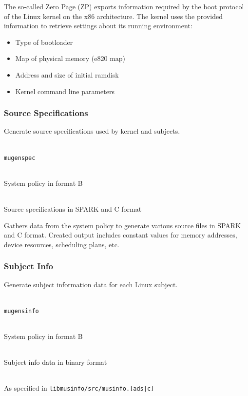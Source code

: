 \documentclass[a4paper,twoside,titlepage]{article}
\begin{document}
The so-called Zero Page (ZP) exports information required by the boot protocol
of the Linux kernel on the x86 architecture. The kernel uses the provided
information to retrieve settings about its running environment:
\begin{itemize}
	\item Type of bootloader
	\item Map of physical memory (e820 map)
	\item Address and size of initial ramdisk
	\item Kernel command line parameters
\end{itemize}

\subsubsection{Source Specifications}
\label{sec:tools-gen-spec}
Generate source specifications used by kernel and subjects.

\begin{description} \itemsep1pt \parskip0pt
	\item[Name] \hfill \\
		\texttt{mugenspec}
	\item[Input] \hfill \\
		System policy in format B
	\item[Output] \hfill \\
		Source specifications in SPARK and C format
\end{description}

Gathers data from the system policy to generate various source files in SPARK
and C format. Created output includes constant values for memory addresses,
device resources, scheduling plans, etc.

\subsubsection{Subject Info}
Generate subject information data for each Linux subject.

\begin{description} \itemsep1pt \parskip0pt
	\item[Name] \hfill \\
		\texttt{mugensinfo}
	\item[Input] \hfill \\
		System policy in format B
	\item[Output] \hfill \\
		Subject info data in binary format
	\item[Output format] \hfill \\
		As specified in \texttt{libmusinfo/src/musinfo.[ads|c]}
\end{description}
\end{document}
